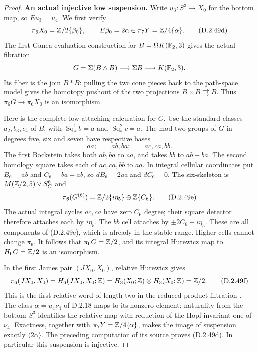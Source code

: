 \begin{proof}
\textbf{An actual injective low suspension.}
Write $u_3:S^3\to X_0$ for the bottom map, so $Eu_3=u_4$.
We first verify
\[
 \pi_6X_0=\mathbb Z/2\{\beta_0\},\qquad
 E\beta_0=2\alpha\in\pi_7Y=\mathbb Z/4\{\alpha\}.
 \tag{D.2.49d}
\]
The first Ganea evaluation construction for
$B=\Omega K(\mathbb F_2,3)$ gives the actual fibration
\[
 G=\Sigma(B\wedge B)\longrightarrow\Sigma B
                    \longrightarrow K(\mathbb F_2,3).
\]
Its fiber is the join $B*B$: pulling the two cone pieces
back to the path-space model gives the homotopy pushout of
the two projections $B\times B\rightrightarrows B$.
Thus $\pi_6G\to\pi_6X_0$ is an isomorphism.

Here is the complete low attaching calculation for $G$.
Use the standard classes $a_2,b_3,c_4$ of $B$, with
$\operatorname{Sq}_*^1b=a$ and
$\operatorname{Sq}_*^2c=a$.
The mod-two groups of $G$ in degrees five, six and seven
have respective bases
\[
                aa;\qquad ab,ba;\qquad ac,ca,bb.
\]
The first Bockstein takes both $ab,ba$ to $aa$, and takes
$bb$ to $ab+ba$.  The second homology square takes each
of $ac,ca,bb$ to $aa$.
In integral cellular coordinates put $B_6=ab$ and
$C_6=ba-ab$, so $dB_6=2aa$ and $dC_6=0$.
The six-skeleton is $M(\mathbb Z/2,5)\vee S^6_C$ and
\[
 \pi_6(G^{(6)})=\mathbb Z/2\{i\eta_5\}\oplus\mathbb Z\{C_6\}.
 \tag{D.2.49e}
\]
The actual integral cycles $ac,ca$ have zero $C_6$ degree;
their square detector therefore attaches each by $i\eta_5$.
The $bb$ cell attaches by $\pm2C_6+i\eta_5$.
These are all components of (D.2.49e), which is already in
the stable range.  Higher cells cannot change $\pi_6$.
It follows that $\pi_6G=\mathbb Z/2$, and its integral Hurewicz
map to $H_6G=\mathbb Z/2$ is an isomorphism.

In the first James pair $(JX_0,X_0)$, relative Hurewicz gives
\[
 \pi_6(JX_0,X_0)=H_6(JX_0,X_0;\mathbb Z)
       =H_3(X_0;\mathbb Z)\otimes H_3(X_0;\mathbb Z)=\mathbb Z/2.
 \tag{D.2.49f}
\]
This is the first relative word of length two in the reduced
product filtration \cite[Sections 3 and 7]{I_James1955}.
The class $\alpha=u_4\nu_4$ of D.2.18 maps to its nonzero
element: naturality from the bottom $S^3$ identifies the
relative map with reduction of the Hopf invariant one of
$\nu_4$.  Exactness, together with
$\pi_7Y=\mathbb Z/4\{\alpha\}$, makes the image of suspension
exactly $\langle2\alpha\rangle$.
The preceding computation of its source proves (D.2.49d).
In particular this suspension is injective.


\end{proof}
